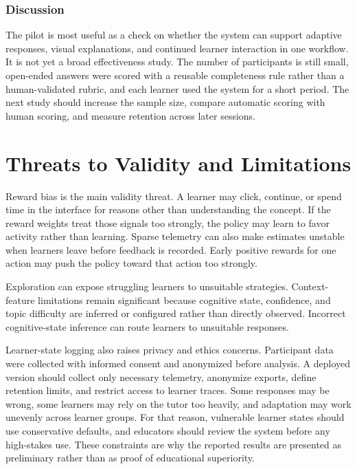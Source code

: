 \documentclass[conference]{IEEEtran}
\begin{document}
\subsubsection{Discussion}

The pilot is most useful as a check on whether the system can support adaptive responses, visual explanations, and continued learner interaction in one workflow. It is not yet a broad effectiveness study. The number of participants is still small, open-ended answers were scored with a reusable completeness rule rather than a human-validated rubric, and each learner used the system for a short period. The next study should increase the sample size, compare automatic scoring with human scoring, and measure retention across later sessions.

\section{Threats to Validity and Limitations}

Reward bias is the main validity threat. A learner may click, continue, or spend time in the interface for reasons other than understanding the concept. If the reward weights treat those signals too strongly, the policy may learn to favor activity rather than learning. Sparse telemetry can also make estimates unstable when learners leave before feedback is recorded. Early positive rewards for one action may push the policy toward that action too strongly.

Exploration can expose struggling learners to unsuitable strategies. Context-feature limitations remain significant because cognitive state, confidence, and topic difficulty are inferred or configured rather than directly observed. Incorrect cognitive-state inference can route learners to unsuitable responses.

Learner-state logging also raises privacy and ethics concerns. Participant data were collected with informed consent and anonymized before analysis. A deployed version should collect only necessary telemetry, anonymize exports, define retention limits, and restrict access to learner traces. Some responses may be wrong, some learners may rely on the tutor too heavily, and adaptation may work unevenly across learner groups. For that reason, vulnerable learner states should use conservative defaults, and educators should review the system before any high-stakes use. These constraints are why the reported results are presented as preliminary rather than as proof of educational superiority.
\end{document}
